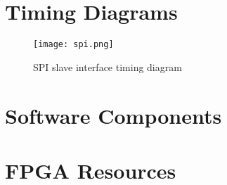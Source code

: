 \documentclass{../../submodules/TEX/document/ug/ug}
\theoremstyle{plain}
\begin{document}
\section{Timing Diagrams}

\begin{figure}[H]
  \begin{center}
    \texttt{[image: spi.png]}
    \caption{SPI slave interface timing diagram}
    \label{fig:spi}
  \end{center}
\end{figure}

\section{Software Components}

\section*{FPGA Resources}



%
%
\end{document}
